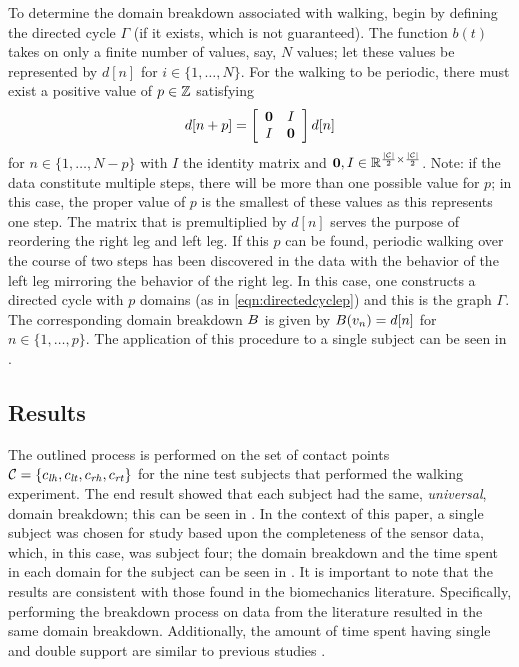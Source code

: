 To determine the domain breakdown associated with walking, begin by defining the
directed cycle $\Gamma$ (if it exists, which is not guaranteed).
%
The function $b(t)$ takes on only a finite number of values, say, $N$ values;
%
let these values be represented by $d[n]$ for $i \in \{1, \ldots, N\}$.
%
For the walking to be periodic, there must exist a positive value of $p \in \mathbb{Z}$
satisfying
\begin{align}
  \label{eq:dstep}
  d[n + p] =
  \left[\begin{array}{c c}
      {\mathbf 0} & I\\
      I & {\mathbf 0}
    \end{array}\right] d[n]
\end{align}
for $n \in \{1, \ldots, N-p\}$ with $I$ the identity matrix and ${\mathbf 0}, I \in \mathbb{R}^{\frac{|\mathcal{C}|}{2} \times \frac{|\mathcal{C}|}{2}}$. Note: if the data constitute multiple steps, there will be more than one possible value for $p$; in this case, the proper value of $p$ is the smallest of these values as this represents one step. The matrix that is premultiplied by $d[n]$ serves the purpose of reordering the right leg and left leg.  If this $p$ can be found, periodic walking over the course of two steps has been discovered in the data with the behavior of the left leg mirroring the behavior of the right leg. In this case, one constructs a directed cycle with $p$ domains (as in \eqref{eqn:directedcyclep}) and this is the graph $\Gamma$. The corresponding domain breakdown $B$ is given by $B(v_{n}) = d[n]$ for $n \in \{1, \ldots, p\}$. The application of this procedure to a single subject can be seen in .

\subsection{Results} The outlined process is performed on the set of contact
points $\mathcal{C} =  \{c_{\mathit{lh}}, c_{\mathit{lt}}, c_{\mathit{rh}} , c_{\mathit{rt}}\}$ for the nine test subjects that
performed the walking experiment. The end result showed that each subject had
the same, {\em universal}, domain breakdown; this can be seen in
. In the context of this paper, a single subject was
chosen for study based upon the completeness of the sensor data, which, in this
case, was subject four; the domain breakdown and the time spent in each domain
for the subject can be seen in . It is important to note that the
results are consistent with those found in the biomechanics
literature. Specifically, performing the breakdown process on data from the
literature \cite{Winter2009} resulted in the same domain breakdown. Additionally,
the amount of time spent having single and double support are similar to
previous studies \cite{Ackermann2007}.

